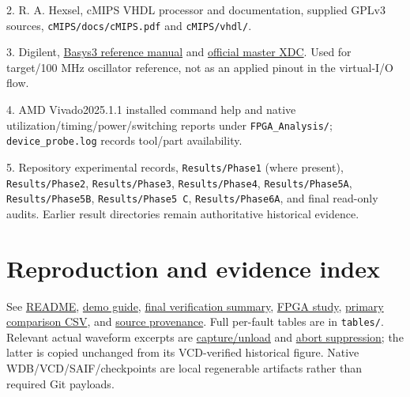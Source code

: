\documentclass[11pt,a4paper]{article}
\begin{document}
2. R. A. Hexsel, cMIPS VHDL processor and documentation, supplied GPLv3 sources, \texttt{cMIPS/docs/cMIPS.pdf} and \texttt{cMIPS/vhdl/}.

3. Digilent, \href{https://digilent.com/reference/_media/basys3\%3A\%20basys3_rm.pdf}{Basys3 reference manual} and \href{https://github.com/Digilent/digilent-xdc/blob/master/Basys-3-Master.xdc}{official master XDC}. Used for target/100 MHz oscillator reference, not as an applied pinout in the virtual-I/O flow.

4. AMD Vivado2025.1.1 installed command help and native utilization/timing/power/switching reports under \texttt{FPGA\_Analysis/}; \texttt{device\_probe.log} records tool/part availability.

5. Repository experimental records, \texttt{Results/Phase1} (where present), \texttt{Results/Phase2}, \texttt{Results/Phase3}, \texttt{Results/Phase4}, \texttt{Results/Phase5A}, \texttt{Results/Phase5B}, \texttt{Results/Phase5 C}, \texttt{Results/Phase6A}, and final read-only audits. Earlier result directories remain authoritative historical evidence.



\section{Reproduction and evidence index}


See \href{README.md}{README}, \href{DEMO.md}{demo guide}, \href{final_verification_summary.md}{final verification summary}, \href{FPGA_Analysis/README.md}{FPGA study}, \href{final_experimental_comparison.csv}{primary comparison CSV}, and \href{source_manifest.csv}{source provenance}. Full per-fault tables are in \texttt{tables/}. Relevant actual waveform excerpts are \href{figures/scan_capture_unload.png}{capture/unload} and \href{figures/misr_abort.svg}{abort suppression}; the latter is copied unchanged from its VCD-verified historical figure. Native WDB/VCD/SAIF/checkpoints are local regenerable artifacts rather than required Git payloads.
\end{document}
